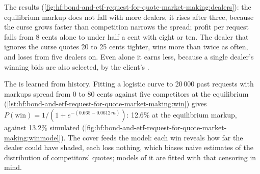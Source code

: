 The results (\cref{fig:hf:bond-and-etf-request-for-quote-market-making:dealers}): the equilibrium markup does not fall with more dealers, it rises
after three, because the curse grows faster than competition narrows the spread; profit per request falls from 8 cents alone to under half a cent
with eight or ten. The dealer that ignores the curse quotes 20 to 25 cents tighter, wins more than twice as often, and loses from five dealers on.
Even alone it earns less, because a single dealer's winning bids are also selected, by the client's .

The  is learned from history. Fitting a logistic curve to 20\,000 past requests with markups spread from 0 to 80 cents against
five competitors at the equilibrium (\cref{lst:hf:bond-and-etf-request-for-quote-market-making:win}) gives
$P(\text{win})=1/(1+e^{-(0.665-0.0612\,m)})$: 12.6\% at the equilibrium markup, against 13.2\% simulated
(\cref{fig:hf:bond-and-etf-request-for-quote-market-making:winmodel}). The cover feeds the model: each win reveals how far the dealer could have
shaded, each loss nothing, which biases naive estimates of the distribution of competitors' quotes; models of it are fitted with that censoring in
mind.

\begin{omfigure}

\label{fig:hf:bond-and-etf-request-for-quote-market-making:winmodel}
\end{omfigure}

